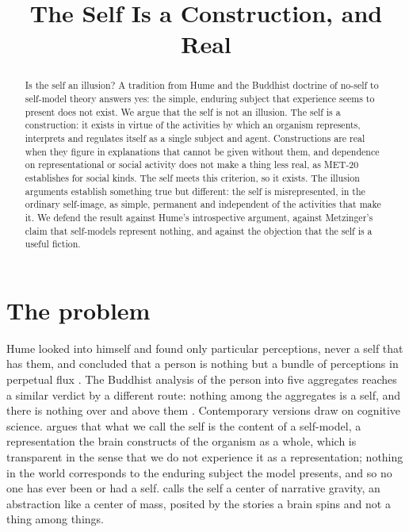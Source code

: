 \documentclass{situationist-preprint}
\title{The Self Is a Construction, and Real}
\begin{document}
\maketitle

\begin{abstract}
Is the self an illusion? A tradition from Hume and the Buddhist doctrine of no-self to self-model theory answers yes: the simple, enduring subject that experience seems to present does not exist. We argue that the self is not an illusion. The self is a construction: it exists in virtue of the activities by which an organism represents, interprets and regulates itself as a single subject and agent. Constructions are real when they figure in explanations that cannot be given without them, and dependence on representational or social activity does not make a thing less real, as MET-20 establishes for social kinds. The self meets this criterion, so it exists. The illusion arguments establish something true but different: the self is misrepresented, in the ordinary self-image, as simple, permanent and independent of the activities that make it. We defend the result against Hume's introspective argument, against Metzinger's claim that self-models represent nothing, and against the objection that the self is a useful fiction.
\end{abstract}

\section{The problem}

Hume looked into himself and found only particular perceptions, never a self that has them, and concluded that a person is nothing but a bundle of perceptions in perpetual flux \citep[1.4.6]{Hume1739}. The Buddhist analysis of the person into five aggregates reaches a similar verdict by a different route: nothing among the aggregates is a self, and there is nothing over and above them \citep{Siderits2003}. Contemporary versions draw on cognitive science. \citet{Metzinger2003} argues that what we call the self is the content of a self-model, a representation the brain constructs of the organism as a whole, which is transparent in the sense that we do not experience it as a representation; nothing in the world corresponds to the enduring subject the model presents, and so no one has ever been or had a self. \citet{Dennett1992} calls the self a center of narrative gravity, an abstraction like a center of mass, posited by the stories a brain spins and not a thing among things.
\end{document}
